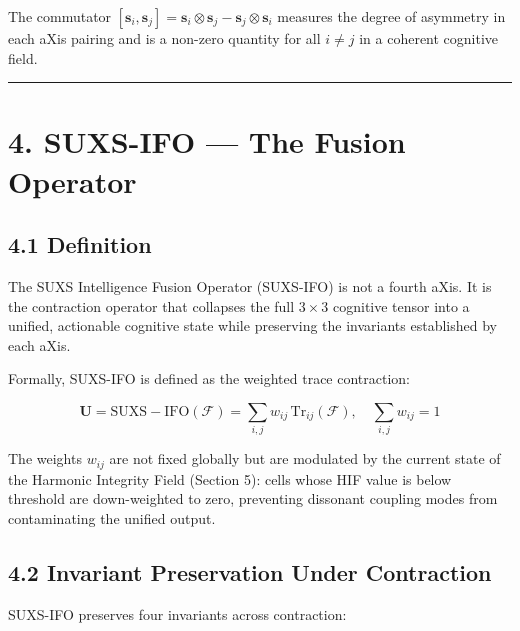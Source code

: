 The commutator \([\mathbf{s}_i, \mathbf{s}_j] = \mathbf{s}_i \otimes \mathbf{s}_j -
\mathbf{s}_j \otimes \mathbf{s}_i\) measures the degree of asymmetry in each aXis pairing and is a non-zero quantity for all \(i \neq j\) in a coherent cognitive field.

\begin{center}\rule{0.5\linewidth}{0.5pt}\end{center}

\section{4. SUXS-IFO --- The Fusion Operator}\label{suxs-ifo-the-fusion-operator}

\subsection{4.1 Definition}\label{definition}

The SUXS Intelligence Fusion Operator (SUXS-IFO) is not a fourth aXis. It is the contraction operator that collapses the full \(3 \times
3\) cognitive tensor into a unified, actionable cognitive state while preserving the invariants established by each aXis.

Formally, SUXS-IFO is defined as the weighted trace contraction:

\[
\mathbf{U} = \mathrm{SUXS-IFO}(\mathcal{F}) = \sum_{i,j} w_{ij}\,
\mathrm{Tr}_{ij}(\mathcal{F}), \quad \sum_{i,j} w_{ij} = 1
\]

The weights \(w_{ij}\) are not fixed globally but are modulated by the current state of the Harmonic Integrity Field (Section 5): cells whose HIF value is below threshold are down-weighted to zero, preventing dissonant coupling modes from contaminating the unified output.

\subsection{4.2 Invariant Preservation Under Contraction}\label{invariant-preservation-under-contraction}

SUXS-IFO preserves four invariants across contraction:

